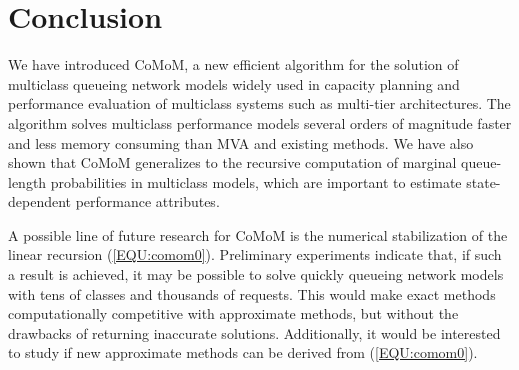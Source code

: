 \documentclass[journal,twocolumn,9.5pt]{IEEEtran}
\begin{document}
\section{Conclusion}
\label{SEC:conclusion}
We have introduced CoMoM, a new efficient algorithm for the solution of multiclass queueing network models widely used in capacity planning and performance evaluation of multiclass systems such as multi-tier architectures. The algorithm solves multiclass performance models several orders of magnitude faster and less memory consuming than MVA and existing methods.
We have also shown that CoMoM generalizes to the recursive computation of marginal queue-length probabilities in multiclass models, which are important to estimate state-dependent performance attributes.

A possible line of future research for CoMoM is the numerical stabilization of the linear recursion (\ref{EQU:comom0}). Preliminary experiments indicate that, if such a result is achieved, it may be possible to solve quickly queueing network models with tens of classes and thousands of requests. This would make exact methods computationally competitive with approximate methods, but without the drawbacks of returning inaccurate solutions. Additionally, it would be interested to study if new approximate methods can be derived from (\ref{EQU:comom0}). %
\end{document}
